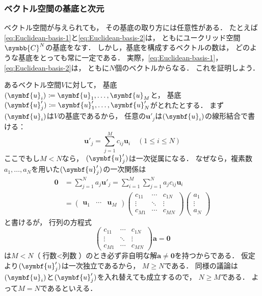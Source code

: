 \documentclass[
]{sotsu}
\begin{document}
\subsubsection{ベクトル空間の基底と次元}

ベクトル空間が与えられても，
その基底の取り方には任意性がある．
たとえば\cref{eq:Euclidean-basis-1}と\cref{eq:Euclidean-basis-2}は，
ともにユークリッド空間$\symbb{C}^N$の基底をなす．
しかし，基底を構成するベクトルの数は，
どのような基底をとっても常に一定である．
実際，\cref{eq:Euclidean-basis-1}，\cref{eq:Euclidean-basis-2}は，
ともに$N$個のベクトルからなる．
これを証明しよう．

あるベクトル空間$V$に対して，
基底$\sequ{\symbf{u}_i} \coloneq \symbf{u}_1, \dots, \symbf{u}_M$と，
基底$\sequ{\symbf{u}'_j} \coloneq \symbf{u}'_1, \dots, \symbf{u}'_N$がとれたとする．
まず$\sequ{\symbf{u}_i}$は$V$の基底であるから，
任意の$\symbf{u}'_j$は$\sequ{\symbf{u}_i}$の線形結合で書ける：
\begin{equation*}
    \symbf{u}'_j = \sum_{j = 1}^{M} c_{ij} \symbf{u}_i
    \quad ( 1 \leq i \leq N )
\end{equation*}
ここでもし$M < N$なら，
$\sequ{\symbf{u}'_j}$は一次従属になる．
なぜなら，複素数$a_1, \dots, a_N$を用いた$\sequ{\symbf{u}'_j}$の一次関係は
\begin{equation*}
    \begin{split}
        \symbf{0} &= \sum_{j = 1}^{N} a_j \symbf{u}'_j
            = \sum_{i = 1}^{M} \sum_{j = 1}^{N} a_j c_{ij} \symbf{u}_i
            \\
            &= 
            \begin{pmatrix}
                \symbf{u}_1  &  \cdots  &  \symbf{u}_M
            \end{pmatrix}
            \begin{pmatrix}
                c_{11}  &  \cdots  &  c_{1N}  \\
                \vdots  &  \ddots  &  \vdots  \\
                c_{M1}  &  \cdots  &  c_{MN}
            \end{pmatrix}
            \begin{pmatrix}
                a_1  \\  \vdots  \\  a_N
            \end{pmatrix}
    \end{split}
\end{equation*}
と書けるが，
行列の方程式
\begin{equation*}
    \begin{pmatrix}
        c_{11}  &  \cdots  &  c_{1N}  \\
        \vdots  &  \ddots  &  \vdots  \\
        c_{M1}  &  \cdots  &  c_{MN}
    \end{pmatrix}
    \symbf{a}
    =
    \symbf{0}
\end{equation*}
は$M < N$（$\text{行数} < \text{列数}$）のとき必ず非自明な解$\symbf{a} \neq \symbf{0}$を持つからである．
仮定より$\sequ{\symbf{u}'_j}$は一次独立であるから，
$M \geq N$である．
同様の議論は$\sequ{\symbf{u}_i}$と$\sequ{\symbf{u}'_j}$を入れ替えても成立するので，
$N \geq M$である．
よって$M = N$であるといえる．
\end{document}
